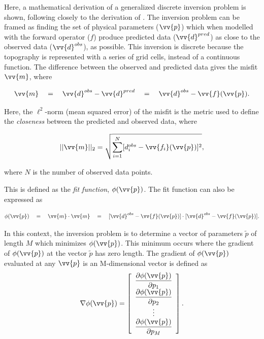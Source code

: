 Here, a mathematical derivation of a generalized discrete inversion problem is shown, following closely to the derivation of \citet{oliveiratopicos2014}. The inversion problem can be framed as finding the set of physical parameters ($\vv{p}$) which when modelled with the forward operator ($f$) produce predicted data ($\vv{d}^{pred}$) as close to the observed data ($\vv{d}^{obs}$), as possible. This inversion is discrete because the topography is represented with a series of grid cells, instead of a continuous function. The difference between the observed and predicted data gives the misfit $\vv{m}$, where 

\begin{equation} \label{eq:misfit}
    \vv{m} \quad = \quad \vv{d}^{obs} - \vv{d}^{pred} \quad = \quad \vv{d}^{obs} - \vv{f}(\vv{p}).
\end{equation}

Here, the $\ell^2$-norm (mean squared error) of the misfit is the metric used to define the \textit{closeness} between the predicted and observed data, where

\begin{equation}
    ||\vv{m}||_2 =  \sqrt{\sum_{i=1}^N [d_i^{obs} - \vv{f_i}(\vv{p})]^2},
\end{equation}

where $N$ is the number of observed data points.

This is defined as the \textit{fit function}, $\phi(\vv{p})$.  The fit function can also be expressed as

\begin{equation}\label{eq:fit_func}
    \phi(\vv{p}) \quad = \quad \vv{m}\cdot\vv{m} \quad = \quad [\vv{d}^{obs} - \vv{f}(\vv{p})]\cdot[\vv{d}^{obs} - \vv{f}(\vv{p})].
\end{equation}

In this context, the inversion problem is to determine a vector of parameters $\tilde{p}$ of length $M$ which minimizes $\phi(\vv{p})$. This minimum occurs where the gradient of $\phi(\vv{p})$ at the vector $\tilde{p}$ has zero length.  The gradient of  $\phi(\vv{p})$ evaluated at any $\vv{p}$ is an M-dimensional vector is defined as 
\begin{equation}\label{eq:gradient}
    \nabla\phi(\vv{p}) = \left[\begin{array}{ccc}
    \dfrac{\partial \phi(\vv{p})}{\partial p_{1}}  \\
    \dfrac{\partial \phi(\vv{p})}{\partial p_{2}}  \\
    \vdots \\
    \dfrac{\partial \phi(\vv{p})}{\partial p_{M}} 
\end{array}\right].
\end{equation}

